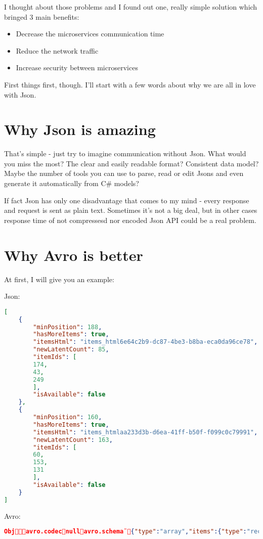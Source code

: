 \documentclass[]{article}
\begin{document}
I thought about those problems and I found out one, really simple solution which bringed 3 main benefits:
\begin{itemize}
	\item Decrease the microservices communication time
	\item Reduce the network traffic 
	\item Increase security between microservices
\end{itemize}


First things first, though. I'll start with a few words about why we are all in love with Json.


\section{Why Json is amazing}
That's simple - just try to imagine communication without Json. What would you miss the most? The clear and easily readable format? Consistent data model? Maybe the number of tools you can use to parse, read or edit Jsons and even generate it automatically from C\# models?

If fact Json has only one disadvantage that comes to my mind - every response and request is sent as plain text. Sometimes it's not a big deal, but in other cases response time of not compressesd nor encoded Json API could be a real problem.  

\section{Why Avro is better}

At first, I will give you an example:

Json:

\begin{lstlisting}[language=json,firstnumber=1]
[
	{
		"minPosition": 188,
		"hasMoreItems": true,
		"itemsHtml": "items_html6e64c2b9-dc87-4be3-b8ba-eca0da96ce78",
		"newLatentCount": 85,
		"itemIds": [
		174,
		43,
		249
		],
		"isAvailable": false
	},
	{
		"minPosition": 160,
		"hasMoreItems": true,
		"itemsHtml": "items_htmlaa233d3b-d6ea-41ff-b50f-f099c0c79991",
		"newLatentCount": 163,
		"itemIds": [
		60,
		153,
		131
		],
		"isAvailable": false
	}
]
\end{lstlisting}

Avro:
\begin{lstlisting}[language=json,firstnumber=1]
Objavro.codecnullavro.schema¨{"type":"array","items":{"type":"record","name":"Dataset","fields":[{"name":"minPosition","type":"int"},{"name":"hasMoreItems","type":"boolean"},{"name":"itemsHtml","type":["null","string"]},{"name":"newLatentCount","type":"int"},{"name":"itemIds","type":{"type":"array","items":"int"}},{"name":"isAvailable","type":"boolean"}]}} /Âźľ)|ř OČëHE řř\items_html6e64c2b9-dc87-4be3-b8ba-eca0da96ce78ŞÜVň  Ŕ\items_htmlaa233d3b-d6ea-41ff-b50f-f099c0c79991Ćx˛†   /Âźľ)|ř OČëHE
\end{lstlisting}
\end{document}
